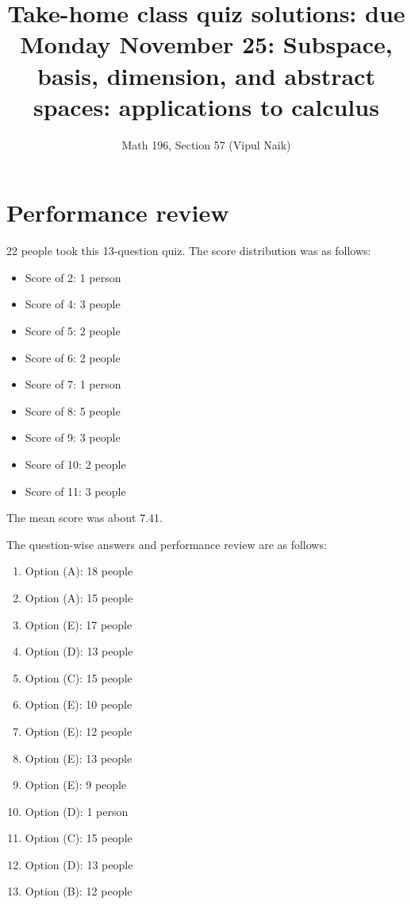 \documentclass[10pt]{amsart}
\title{Take-home class quiz solutions: due Monday November 25: Subspace, basis, dimension, and abstract spaces: applications to calculus}
\author{Math 196, Section 57 (Vipul Naik)}
\begin{document}
\maketitle

\section{Performance review}

22 people took this 13-question quiz. The score distribution was as follows:

\begin{itemize}
\item Score of 2: 1 person
\item Score of 4: 3 people
\item Score of 5: 2 people
\item Score of 6: 2 people
\item Score of 7: 1 person
\item Score of 8: 5 people
\item Score of 9: 3 people
\item Score of 10: 2 people
\item Score of 11: 3 people
\end{itemize}

The mean score was about 7.41.

The question-wise answers and performance review are as follows:

\begin{enumerate}
\item Option (A): 18 people%
\item Option (A): 15 people%
\item Option (E): 17 people%
\item Option (D): 13 people%
\item Option (C): 15 people%
\item Option (E): 10 people%
\item Option (E): 12 people%
\item Option (E): 13 people%
\item Option (E): 9 people%
\item Option (D): 1 person%
\item Option (C): 15 people%
\item Option (D): 13 people%
\item Option (B): 12 people%
\end{enumerate}
\end{document}
